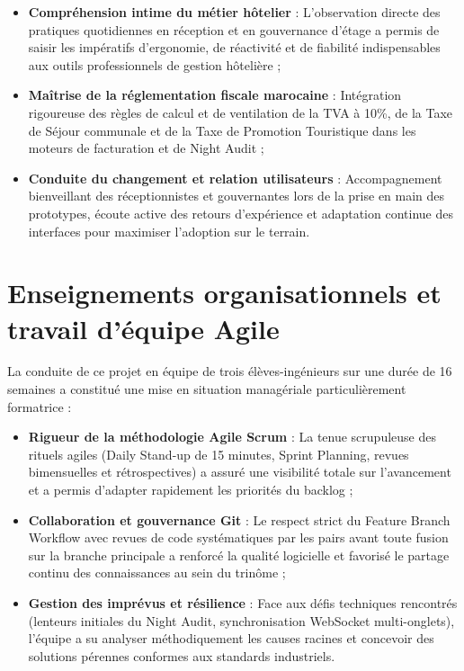 \documentclass[12pt,a4paper,oneside]{report}
\begin{document}
\begin{itemize}
    \item \textbf{Compréhension intime du métier hôtelier} : L'observation directe des pratiques quotidiennes en réception et en gouvernance d'étage a permis de saisir les impératifs d'ergonomie, de réactivité et de fiabilité indispensables aux outils professionnels de gestion hôtelière ;
    \item \textbf{Maîtrise de la réglementation fiscale marocaine} : Intégration rigoureuse des règles de calcul et de ventilation de la TVA à 10\%, de la Taxe de Séjour communale et de la Taxe de Promotion Touristique dans les moteurs de facturation et de Night Audit ;
    \item \textbf{Conduite du changement et relation utilisateurs} : Accompagnement bienveillant des réceptionnistes et gouvernantes lors de la prise en main des prototypes, écoute active des retours d'expérience et adaptation continue des interfaces pour maximiser l'adoption sur le terrain.
\end{itemize}

\section{Enseignements organisationnels et travail d'équipe Agile}

La conduite de ce projet en équipe de trois élèves-ingénieurs sur une durée de 16 semaines a constitué une mise en situation managériale particulièrement formatrice :

\begin{itemize}
    \item \textbf{Rigueur de la méthodologie Agile Scrum} : La tenue scrupuleuse des rituels agiles (Daily Stand-up de 15 minutes, Sprint Planning, revues bimensuelles et rétrospectives) a assuré une visibilité totale sur l'avancement et a permis d'adapter rapidement les priorités du backlog ;
    \item \textbf{Collaboration et gouvernance Git} : Le respect strict du Feature Branch Workflow avec revues de code systématiques par les pairs avant toute fusion sur la branche principale a renforcé la qualité logicielle et favorisé le partage continu des connaissances au sein du trinôme ;
    \item \textbf{Gestion des imprévus et résilience} : Face aux défis techniques rencontrés (lenteurs initiales du Night Audit, synchronisation WebSocket multi-onglets), l'équipe a su analyser méthodiquement les causes racines et concevoir des solutions pérennes conformes aux standards industriels.
\end{itemize}
\end{document}
